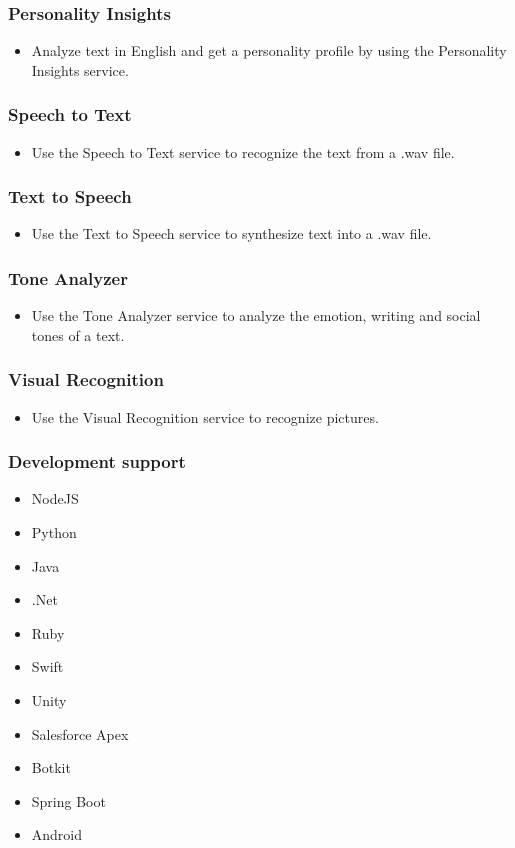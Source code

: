 \documentclass[11pt]{beamer}
\begin{document}
\begin{frame}
	\frametitle{Personality Insights}
	\begin{itemize}
		\item Analyze text in English and get a personality profile by using the Personality Insights service.
	\end{itemize}
	
\end{frame}

\begin{frame}
	\frametitle{Speech to Text}
	\begin{itemize}
		\item Use the Speech to Text service to recognize the text from a .wav file.
	\end{itemize}
	
\end{frame}

\begin{frame}
	\frametitle{Text to Speech}
	\begin{itemize}
		\item Use the Text to Speech service to synthesize text into a .wav file.
	\end{itemize}
	
\end{frame}

\begin{frame}
	\frametitle{Tone Analyzer}
	\begin{itemize}
		\item Use the Tone Analyzer service to analyze the emotion, writing and social tones of a text.
	\end{itemize}
	
\end{frame}

\begin{frame}
	\frametitle{Visual Recognition}
	\begin{itemize}
		\item Use the Visual Recognition service to recognize pictures.
	\end{itemize}
	
\end{frame}


\begin{frame}
\frametitle{Development support}
\begin{itemize}
	\item NodeJS
	\item Python
	\item Java
	\item .Net
	\item Ruby
	\item Swift
	\item Unity
	\item Salesforce Apex
	\item Botkit
	\item Spring Boot
	\item Android
\end{itemize}
\end{frame}
\end{document}
